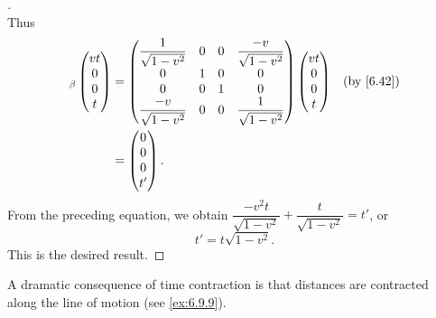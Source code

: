 \begin{proof}[]
\[  \]
  Thus
  \begin{align*}
    [\T_v]_{\beta} \begin{pmatrix}
                     vt \\
                     0  \\
                     0  \\
                     t
                   \end{pmatrix} & = \begin{pmatrix}
                                       \dfrac{1}{\sqrt{1 - v^2}}  & 0 & 0 & \dfrac{-v}{\sqrt{1 - v^2}} \\
                                       0                          & 1 & 0 & 0                          \\
                                       0                          & 0 & 1 & 0                          \\
                                       \dfrac{-v}{\sqrt{1 - v^2}} & 0 & 0 & \dfrac{1}{\sqrt{1 - v^2}}
                                     \end{pmatrix} \begin{pmatrix}
                                                     vt \\
                                                     0  \\
                                                     0  \\
                                                     t
                                                   \end{pmatrix} &  & \by{6.42} \\
                                   & = \begin{pmatrix}
                                         0 \\
                                         0 \\
                                         0 \\
                                         t'
                                       \end{pmatrix}.
  \end{align*}
  From the preceding equation, we obtain \(\dfrac{-v^2 t}{\sqrt{1 - v^2}} + \dfrac{t}{\sqrt{1 - v^2}} = t'\), or
  \[
    t' = t \sqrt{1 - v^2}.
  \]
  This is the desired result.
\end{proof}

\begin{note}
  A dramatic consequence of time contraction is that distances are contracted along the line of motion (see \cref{ex:6.9.9}).
\end{note}

